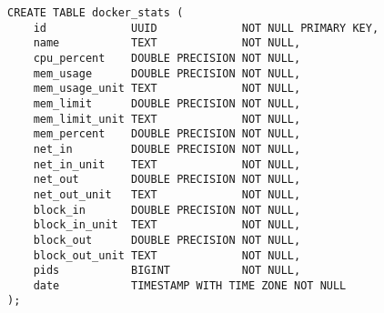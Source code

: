 \documentclass[../../../../main]{subfiles}
\begin{document}
    \begin{mdframed}
        \begin{verbatim}
CREATE TABLE docker_stats (
    id             UUID             NOT NULL PRIMARY KEY,
    name           TEXT             NOT NULL,
    cpu_percent    DOUBLE PRECISION NOT NULL,
    mem_usage      DOUBLE PRECISION NOT NULL,
    mem_usage_unit TEXT             NOT NULL,
    mem_limit      DOUBLE PRECISION NOT NULL,
    mem_limit_unit TEXT             NOT NULL,
    mem_percent    DOUBLE PRECISION NOT NULL,
    net_in         DOUBLE PRECISION NOT NULL,
    net_in_unit    TEXT             NOT NULL,
    net_out        DOUBLE PRECISION NOT NULL,
    net_out_unit   TEXT             NOT NULL,
    block_in       DOUBLE PRECISION NOT NULL,
    block_in_unit  TEXT             NOT NULL,
    block_out      DOUBLE PRECISION NOT NULL,
    block_out_unit TEXT             NOT NULL,
    pids           BIGINT           NOT NULL,
    date           TIMESTAMP WITH TIME ZONE NOT NULL
);
        \end{verbatim}
    \end{mdframed}
    \label{fig:docker_stats-table-definication}
\end{document}
